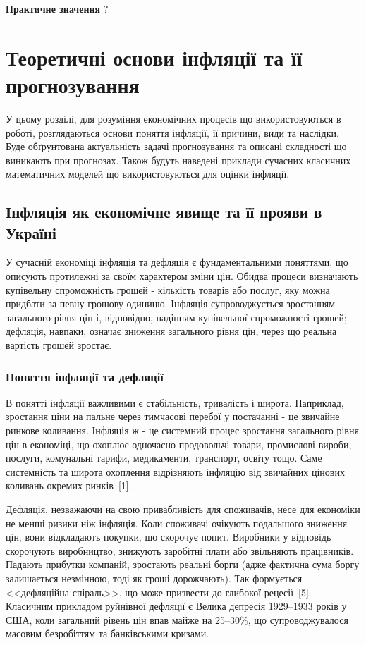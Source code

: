 \documentclass[a4paper,ukrainian,oneside]{extreport}
\newcommand{\setfontsize}[1]{\fontsize{#1pt}{#1pt}\selectfont}
\begin{document}
\textbf{Практичне значення} ?

\doublespacing
\setfontsize{14}

\chapter{Теоретичні основи інфляції та її прогнозування}

У цьому розділі, для розуміння економічних процесів що використовуються в роботі, розглядаються основи поняття інфляції, її причини, види та наслідки. Буде обґрунтована актуальність задачі прогнозування та описані складності що виникають при прогнозах. Також будуть наведені приклади сучасних класичних математичних моделей що використовуються для оцінки інфляції.

\section{Інфляція як економічне явище та її прояви в Україні}

У сучасній економіці інфляція та дефляція є фундаментальними поняттями, що описують протилежні за своїм характером зміни цін. Обидва процеси визначають купівельну спроможність грошей - кількість товарів або послуг, яку можна придбати за певну грошову одиницю. Інфляція супроводжується зростанням загального рівня цін і, відповідно, падінням купівельної спроможності грошей; дефляція, навпаки, означає зниження загального рівня цін, через що реальна вартість грошей зростає.

\subsection{Поняття інфляції та дефляції}


В понятті інфляції важливими є стабільність, тривалість і широта. Наприклад, зростання ціни на пальне через тимчасові перебої у постачанні - це звичайне ринкове коливання. Інфляція ж - це системний процес зростання загального рівня цін в економіці, що охоплює одночасно продовольчі товари, промислові вироби, послуги, комунальні тарифи, медикаменти, транспорт, освіту тощо. Саме системність та широта охоплення відрізняють інфляцію від звичайних цінових коливань окремих ринків~[1].

Дефляція, незважаючи на свою привабливість для споживачів, несе для економіки не менші ризики ніж інфляція. Коли споживачі очікують подальшого зниження цін, вони відкладають покупки, що скорочує попит. Виробники у відповідь скорочують виробництво, знижують заробітні плати або звільняють працівників. Падають прибутки компаній, зростають реальні борги (адже фактична сума боргу залишається незмінною, тоді як гроші дорожчають). Так формується <<дефляційна спіраль>>, що може призвести до глибокої рецесії~[5]. Класичним прикладом руйнівної дефляції є Велика депресія 1929--1933 років у США, коли загальний рівень цін впав майже на 25--30\%, що супроводжувалося масовим безробіттям та банківськими кризами.
\end{document}
